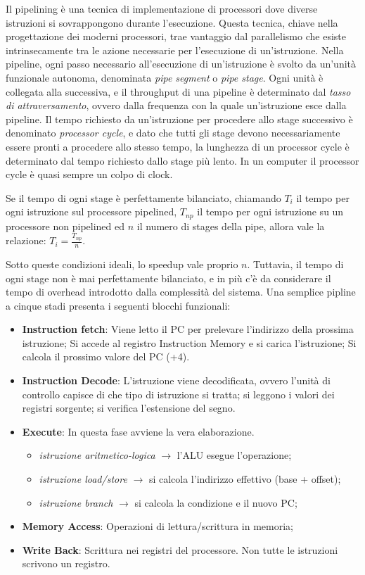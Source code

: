 Il pipelining è una tecnica di implementazione di processori dove diverse istruzioni si sovrappongono durante l'esecuzione. Questa tecnica, chiave nella progettazione dei moderni processori, trae vantaggio dal parallelismo che esiste intrinsecamente tra le azione necessarie per l'esecuzione di un'istruzione.
Nella pipeline, ogni passo necessario all'esecuzione di un'istruzione è svolto da un'unità funzionale autonoma, denominata \textit{pipe segment} o \textit{pipe stage}. Ogni unità è collegata alla successiva, e il throughput di una pipeline è determinato dal \textit{tasso di attraversamento}, ovvero dalla frequenza con la quale un'istruzione esce dalla pipeline. Il tempo richiesto da un'istruzione per procedere allo stage successivo è denominato \textit{processor cycle}, e dato che tutti gli stage devono necessariamente essere pronti a procedere allo stesso tempo, la lunghezza di un processor cycle è determinato dal tempo richiesto dallo stage più lento. In un computer il processor cycle è quasi sempre un colpo di clock. 

\noindent
Se il tempo di ogni stage è perfettamente bilanciato, chiamando $T_i$ il tempo per ogni istruzione sul processore pipelined, $T_{np}$ il tempo per ogni istruzione su un processore non pipelined ed $n$ il numero di stages della pipe, allora vale la relazione: $T_i = \frac{T_{np}}{n}$.

\noindent Sotto queste condizioni ideali, lo speedup vale proprio $n$. Tuttavia, il tempo di ogni stage non è mai perfettamente bilanciato, e in più c'è da considerare il tempo di overhead introdotto dalla complessità del sistema. 
Una semplice pipline a cinque stadi presenta i seguenti blocchi funzionali:

\begin{itemize}
    \item \textbf{Instruction fetch}: Viene letto il PC per prelevare l'indirizzo della prossima istruzione; Si accede al registro Instruction Memory e si carica l'istruzione; Si calcola il prossimo valore del PC (+4).
    \item \textbf{Instruction Decode}: L'istruzione viene decodificata, ovvero l'unità di controllo capisce di che tipo di istruzione si tratta; si leggono i valori dei registri sorgente; si verifica l'estensione del segno. 
    \item \textbf{Execute}: In questa fase avviene la vera elaborazione. 
    \begin{itemize}
        \item \textit{istruzione aritmetico-logica} $\rightarrow$ l'ALU esegue l'operazione;
        \item \textit{istruzione load/store} $\rightarrow$ si calcola l'indirizzo effettivo (base + offset);
        \item \textit{istruzione branch} $\rightarrow$ si calcola la condizione e il nuovo PC;
    \end{itemize}
    \item \textbf{Memory Access}: Operazioni di lettura/scrittura in memoria;
    \item \textbf{Write Back}: Scrittura nei registri del processore. Non tutte le istruzioni scrivono un registro. 
\end{itemize}

